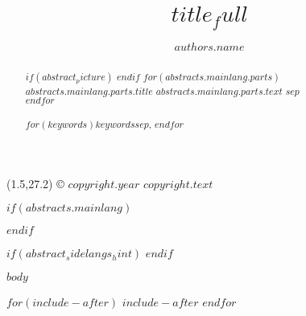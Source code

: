 \documentclass[twoside]{jchs}
\title{$title_full$}
\author[$authors.affiliation_ids$$if(authors.corresponding)$*$endif$]{$authors.name$} %
\affil[$affiliations.id$]{$affiliations.address$}
\begin{document}
\thispagestyle{empty}
\enlargethispage{-2\baselineskip}
\begin{textblock}{18}(1.5,27.2)
	\footnotesize{\noindent © $copyright.year$ $copyright.text$}
\end{textblock}




$if(abstracts.mainlang)$
\begin{abstract}
$if(abstract_picture)$
\emergencystretch 1pt
$endif$
$for(abstracts.mainlang.parts)$
{\bfseries $abstracts.mainlang.parts.title$} $abstracts.mainlang.parts.text$ $sep$\\ 	
$endfor$\\
\\
\noindent
{\fontsize{10}{12}\selectfont{} 
$for(keywords)$$keywords$$sep$, $endfor$}
\end{abstract}
$endif$


$if(abstract_sidelangs_hint)$
\newcommand{\abstracthint}{$abstract_sidelangs_hint$}
$endif$

\maketitle\thispagestyle{empty} %












\begin{multicols}{2}
\raggedcolumns
$body$
\end{multicols}

$for(include-after)$
$include-after$
$endfor$



%
% 
\end{document}

